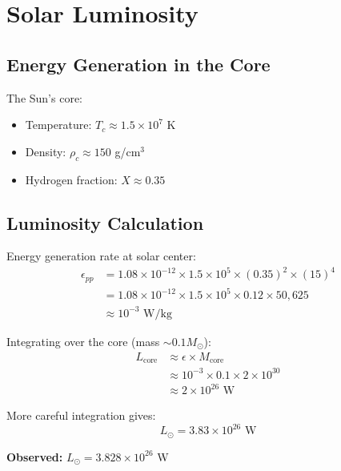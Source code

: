 \documentclass[12pt,a4paper]{article}
\newcommand{\Msun}{M_\odot}
\begin{document}
\section{Solar Luminosity}

\subsection{Energy Generation in the Core}

The Sun's core:
\begin{itemize}
    \item Temperature: $T_c \approx 1.5 \times 10^7$ K
    \item Density: $\rho_c \approx 150$ g/cm$^3$
    \item Hydrogen fraction: $X \approx 0.35$
\end{itemize}

\subsection{Luminosity Calculation}

\begin{numerical}
Energy generation rate at solar center:
\begin{align*}
\epsilon_{pp} &= 1.08 \times 10^{-12} \times 1.5 \times 10^5 \times (0.35)^2 \times (15)^4 \\
&= 1.08 \times 10^{-12} \times 1.5 \times 10^5 \times 0.12 \times 50,\!625 \\
&\approx 10^{-3} \text{ W/kg}
\end{align*}

Integrating over the core (mass $\sim 0.1 \Msun$):
\begin{align*}
L_{\text{core}} &\approx \epsilon \times M_{\text{core}} \\
&\approx 10^{-3} \times 0.1 \times 2 \times 10^{30} \\
&\approx 2 \times 10^{26} \text{ W}
\end{align*}

More careful integration gives:
\begin{equation*}
L_\odot = 3.83 \times 10^{26} \text{ W}
\end{equation*}

\textbf{Observed:} $L_\odot = 3.828 \times 10^{26}$ W \checkmark
\end{numerical}

\end{document}
